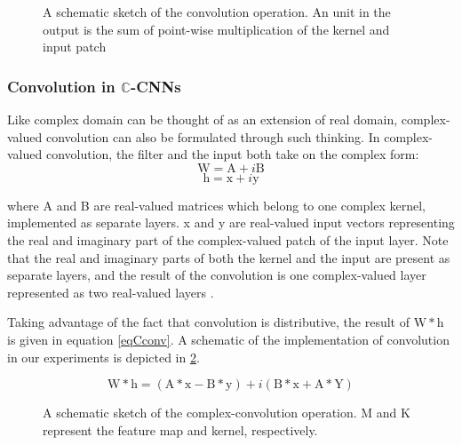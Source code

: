 \begin{figure}[htb]
	\centering
	\epsfxsize=6cm
	{}
	\caption{A schematic sketch of the convolution operation. An unit in the output is the sum of point-wise multiplication of the kernel and input patch \cite{bloggg}}
	\label{fig:conv}
\end{figure}
 

\subsubsection{Convolution in $\mathbb{C}$-CNNs}
Like complex domain can be thought of as an extension of real domain, complex-valued convolution can also be formulated through such thinking. In complex-valued convolution, the filter and the input both take on the complex form:
 \begin{equation}
\mathrm{W} = \mathrm{A}+i\mathrm{B}
\label{eqCfilter}
\end{equation}
 \begin{equation}
\mathrm{h} = \mathrm{x}+i\mathrm{y}
\label{eqCinput}
\end{equation}
 
where A and B are real-valued matrices which belong to one complex kernel, implemented as separate layers. x and y are real-valued input vectors  representing the real and imaginary part of the complex-valued patch of the input layer. Note that the real and imaginary parts of both the kernel and the input are present as separate layers, and the result of the convolution is one complex-valued layer represented as two real-valued layers \cite{Guberman}. 

Taking advantage of the fact that convolution is distributive, the result of $\mathrm{W*h}$ is given in equation \ref{eqCconv}. A schematic of the implementation of convolution in our experiments is depicted in \ref{fig:complexconv}.

 \begin{equation}
\mathrm{W*h} = (\mathrm{A*x-B*y})+i(\mathrm{B*x+A*Y})
\label{eqCconv}
\end{equation}

 \begin{figure}[htb]
	\centering
	\epsfxsize=10cm
	{}
	\caption{A schematic sketch of the complex-convolution operation. M and K represent the feature map and kernel, respectively.  \cite{trabelsi2018deep}}
	\label{fig:complexconv}
\end{figure}

